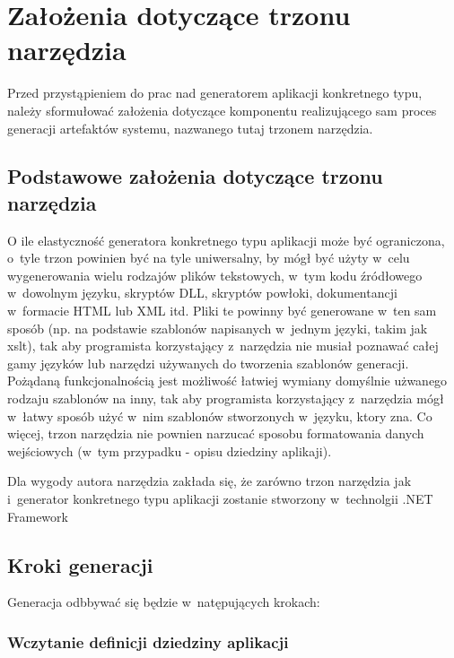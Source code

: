 \chapter{Założenia dotyczące trzonu narzędzia} \label{chap:implementation:core}

Przed przystąpieniem do prac nad generatorem aplikacji konkretnego typu, należy sformułować założenia dotyczące komponentu realizującego sam proces generacji artefaktów systemu, nazwanego tutaj trzonem narzędzia.



\section{Podstawowe założenia dotyczące trzonu narzędzia} \label{sec:core:basic_requirements}

O ile elastyczność generatora konkretnego typu aplikacji może być ograniczona, o~tyle trzon powinien być na tyle uniwersalny, by mógł być użyty w~celu wygenerowania wielu rodzajów plików tekstowych, w~tym kodu źródłowego w~dowolnym języku, skryptów DLL, skryptów powłoki, dokumentancji w~formacie HTML lub XML itd.
Pliki te powinny być generowane w~ten sam sposób (np. na podstawie szablonów napisanych w~jednym języki, takim jak xslt), tak aby programista korzystający z~narzędzia nie musiał poznawać całej gamy języków lub narzędzi używanych do tworzenia szablonów generacji.
Pożądaną funkcjonalnością jest możliwość łatwiej wymiany domyślnie użwanego rodzaju szablonów na inny, tak aby programista korzystający z~narzędzia mógł w~łatwy sposób użyć w~nim szablonów stworzonych w~języku, ktory zna.
Co więcej, trzon narzędzia nie pownien narzucać sposobu formatowania danych wejściowych (w~tym przypadku - opisu dziedziny aplikaji).

Dla wygody autora narzędzia zakłada się, że zarówno trzon narzędzia jak i~generator konkretnego typu aplikacji zostanie stworzony w~technolgii .NET Framework



\section{Kroki generacji}

Generacja odbbywać się będzie w~natępujących krokach:


\subsection{Wczytanie definicji dziedziny aplikacji}

